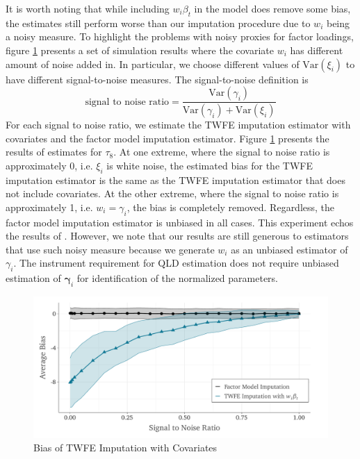 It is worth noting that while including $w_i \beta_t$ in the model does remove some bias, the estimates still perform worse than our imputation procedure due to $w_i$ being a noisy measure. To highlight the problems with noisy proxies for factor loadings, figure \ref{fig:noisy_w} presents a set of simulation results where the covariate $w_i$ has different amount of noise added in. In particular, we choose different values of $\text{Var}(\xi_i)$ to have different signal-to-noise measures. The signal-to-noise definition is 
\begin{equation}
    \text{signal to noise ratio} = \frac{\text{Var}(\gamma_i)}{\text{Var}(\gamma_i) + \text{Var}(\xi_i)}
\end{equation}
For each signal to noise ratio, we estimate the TWFE imputation estimator with covariates and the factor model imputation estimator. Figure \ref{fig:noisy_w} presents the results of estimates for $\tau_8$. At one extreme, where the signal to noise ratio is approximately 0, i.e. $\xi_i$ is white noise, the estimated bias for the TWFE imputation estimator is the same as the TWFE imputation estimator that does not include covariates. At the other extreme, where the signal to noise ratio is approximately 1, i.e. $w_i = \gamma_i$, the bias is completely removed. Regardless, the factor model imputation estimator is unbiased in all cases. This experiment echos the results of \citet{kejriwal2021efficacy}. However, we note that our results are still generous to estimators that use such noisy measure because we generate $w_i$ as an unbiased estimator of $\gamma_i$. The instrument requirement for QLD estimation does not require unbiased estimation of $\bm \gamma_i$ for identification of the normalized parameters.

\begin{figure}
\begin{adjustbox}{width=.8\textwidth, center}
  \includegraphics{figures/generalized/simulation-bias_signal_to_noise.pdf}
\end{adjustbox}
\caption{Bias of TWFE Imputation with Covariates}\label{fig:noisy_w}

\end{figure}


